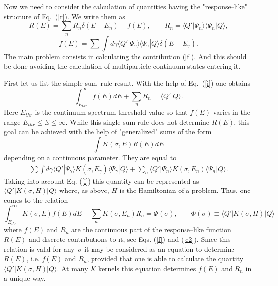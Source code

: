 \documentclass[12pt,ams,preprint,a4paper]{revtex4}
\begin{document}
Now we need to consider the calculation of quantities having the "response--like" structure of
Eq.~(\ref{r}). We write them as   
\begin{equation} R(E)=\sum_n R_n\delta(E-E_n)+f(E),\qquad R_n=\langle Q'|\Psi_n\rangle 
\langle\Psi_n|Q\rangle,\label{c2}\end{equation}
\begin{equation} f(E)=
\sum\!\!\!\!\!\!\!\int d\gamma\langle Q'|\Psi_\gamma\rangle\langle\Psi_\gamma|Q\rangle
\delta(E-E_\gamma)\label{f}.\end{equation}
The main problem consists in calculating the contribution (\ref{f}).
And this should be done avoiding the calculation of multiparticle continuum states entering it.


First let us list the simple sum--rule result. With the help of Eq.~(\ref{i}) 
one obtains
\begin{equation}\int_{E_{thr}}^\infty f(E)dE+\sum_n R_n=\langle Q'|Q\rangle.\label{s}\end{equation}
Here $E_{thr}$ is the continuum spectrum threshold value so that $f(E)$ varies in the range 
\mbox{$E_{thr}\le E\le\infty$}. While this single sum rule does not determine $R(E)$, this
goal can be achieved with the help of "generalized" sums of the form
\begin{equation} \int K(\sigma,E)R(E)dE\label{ineq}\end{equation}
depending on a continuous parameter.
They  are equal to
\begin{eqnarray}
\sum\!\!\!\!\!\!\!\int d\gamma\langle Q'|\Psi_\gamma\rangle K(\sigma,E_\gamma)
\langle\Psi_\gamma|Q\rangle+\sum_n\langle Q'|\Psi_n\rangle K(\sigma,E_n)
\langle\Psi_n|Q\rangle.
\end{eqnarray}
Taking into account Eq. (\ref{i}) this quantity can be represented as
\mbox{$\langle Q'|K(\sigma,H)|Q\rangle$}
where, as above, $H$ is the Hamiltonian of a problem. 
Thus, one 
comes to the  relation
\begin{equation}
\int_{E_{thr}}^\infty K(\sigma,E)f(E)dE+\sum_nK(\sigma,E_n)R_n=\Phi(\sigma),\qquad 
\Phi(\sigma)\equiv\langle Q'|K(\sigma,H)|Q\rangle
\label{inteq}
\end{equation}
where $f(E)$ and $R_n$ are the continuous part of the response--like function  $R(E)$ 
and discrete contributions to it, see Eqs. (\ref{f}) and (\ref{c2}).
Since this relation is valid for any~$\sigma$ it may be considered as an equation to determine $R(E)$,
i.e. $f(E)$ and $R_n$,
 provided that  one is able to calculate 
the quantity \mbox{$\langle Q'|K(\sigma,H)|Q\rangle$}. At many $K$ kernels this equation determines
$f(E)$ and $R_n$ in a unique way. 
\end{document}

